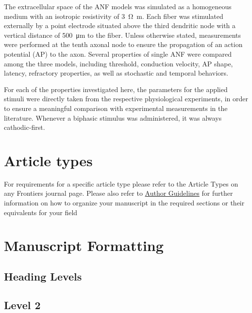 \documentclass[utf8]{frontiersSCNS} %
\begin{document}
The extracellular space of the ANF models was simulated as a homogeneous medium with an isotropic resistivity of \SI{3}{\ohm\meter}. Each fiber was stimulated externally by a point electrode situated above the third dendritic node with a vertical distance of \SI{500}{\micro\meter} to the fiber. Unless otherwise stated, measurements were performed at the tenth axonal node to ensure the propagation of an action potential (AP) to the axon. Several properties of single ANF were compared among the three models, including threshold, conduction velocity, AP shape, latency, refractory properties, as well as stochastic and temporal behaviors. 

For each of the properties investigated here, the parameters for the applied stimuli were directly taken from the respective physiological experiments, in order to ensure a meaningful comparison with experimental measurements in the literature. Whenever a biphasic stimulus was administered, it was always cathodic-first.



\section{Article types}

For requirements for a specific article type please refer to the Article Types on any Frontiers journal page. Please also refer to  \href{http://home.frontiersin.org/about/author-guidelines#Sections}{Author Guidelines} for further information on how to organize your manuscript in the required sections or their equivalents for your field


\section{Manuscript Formatting}

\subsection{Heading Levels}


\subsection{Level 2}
\end{document}
